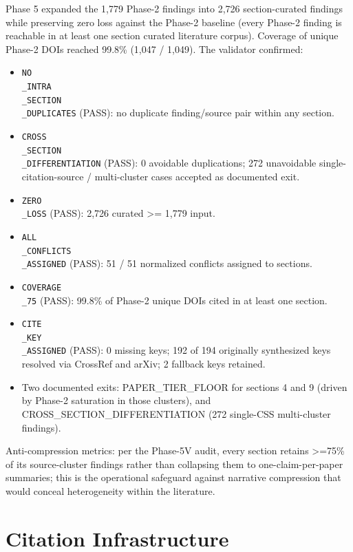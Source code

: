 \documentclass[11pt]{article}
\begin{document}
\bigskip

Phase 5 expanded the 1,779 Phase-2 findings into 2,726 section-curated findings while preserving zero loss against the Phase-2 baseline (every Phase-2 finding is reachable in at least one section curated literature corpus). Coverage of unique Phase-2 DOIs reached 99.8\% (1,047 / 1,049). The validator confirmed:

\begin{itemize}
\item \texttt{NO\\_INTRA\\_SECTION\\_DUPLICATES} (PASS): no duplicate finding/source pair within any section.
\item \texttt{CROSS\\_SECTION\\_DIFFERENTIATION} (PASS): 0 avoidable duplications; 272 unavoidable single-citation-source / multi-cluster cases accepted as documented exit.
\item \texttt{ZERO\\_LOSS} (PASS): 2,726 curated \textgreater = 1,779 input.
\item \texttt{ALL\\_CONFLICTS\\_ASSIGNED} (PASS): 51 / 51 normalized conflicts assigned to sections.
\item \texttt{COVERAGE\\_75} (PASS): 99.8\% of Phase-2 unique DOIs cited in at least one section.
\item \texttt{CITE\\_KEY\\_ASSIGNED} (PASS): 0 missing keys; 192 of 194 originally synthesized keys resolved via CrossRef and arXiv; 2 fallback keys retained.
\item Two documented exits: PAPER\_TIER\_FLOOR for sections 4 and 9 (driven by Phase-2 saturation in those clusters), and CROSS\_SECTION\_DIFFERENTIATION (272 single-CSS multi-cluster findings).
\end{itemize}

Anti-compression metrics: per the Phase-5V audit, every section retains \textgreater =75\% of its source-cluster findings rather than collapsing them to one-claim-per-paper summaries; this is the operational safeguard against narrative compression that would conceal heterogeneity within the literature.

\section{Citation Infrastructure}\label{sec-methods-citation-infra}
\end{document}
